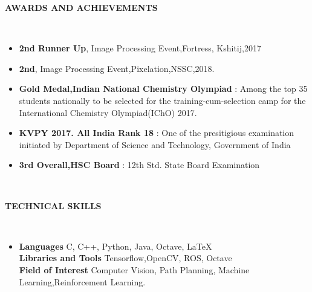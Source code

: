 \documentclass[a4paper,10pt]{article}
\newcommand{\lsep}{-0.5cm}
\newcommand{\resheading}[1]{{\small \colorbox{mygrey}{\begin{minipage}{0.975\textwidth}{\textbf{#1 \vphantom{p\^{E}}}}\end{minipage}}}}
\begin{document}
\resheading{\textbf{AWARDS AND ACHIEVEMENTS} }\\[\lsep]
\begin{itemize}

\item \noindent \textbf{2nd Runner Up}, Image Processing Event,Fortress, Kshitij,2017 
\item \noindent \textbf{2nd}, Image Processing Event,Pixelation,NSSC,2018.
\item \noindent \textbf{Gold Medal,Indian National Chemistry Olympiad} : Among the top 35 students nationally to be selected for the training-cum-selection camp for the International Chemistry Olympiad(IChO) 2017.
\item \noindent \textbf{KVPY 2017. All India Rank 18} :
One of the presitigious examination initiated by Department of Science and Technology, Government of India
\item \noindent \textbf{3rd Overall,HSC Board} : 12th Std. State Board Examination
\end{itemize}

\hspace{0.5cm}\\[-0.2cm]
\resheading{\textbf{TECHNICAL SKILLS} }\\[\lsep]
\begin{itemize}
\item \noindent \textbf{Languages} C, C++, Python, Java, Octave, {\LaTeX{}} \\
\textbf{Libraries and Tools} Tensorflow,OpenCV, ROS, Octave \\
\textbf{Field of Interest} Computer Vision, Path Planning, Machine Learning,Reinforcement Learning. \\
\end{itemize}
\end{document}
